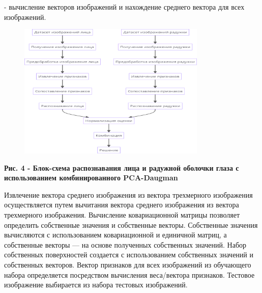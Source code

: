 - вычисление векторов изображений и нахождение среднего вектора для всех
изображений.

\begin{figure}[H]
	\centering
	\includegraphics[width=0.8\textwidth]{assets/86}
	\caption*{}
\end{figure}

\textbf{Рис. 4 - Блок-схема распознавания лица и радужной оболочки глаза
с использованием комбинированного PCA-Daugman}

Извлечение вектора среднего изображения из вектора трехмерного
изображения осуществляется путем вычитания вектора среднего изображения
из вектора трехмерного изображения. Вычисление ковариационной матрицы
позволяет определить собственные значения и собственные векторы.
Собственные значения вычисляются с использованием ковариационной и
единичной матриц, а собственные векторы --- на основе полученных
собственных значений. Набор собственных поверхностей создается с
использованием собственных значений и собственных векторов. Вектор
признаков для всех изображений из обучающего набора определяется
посредством вычисления веса/вектора признаков. Тестовое изображение
выбирается из набора тестовых изображений.

